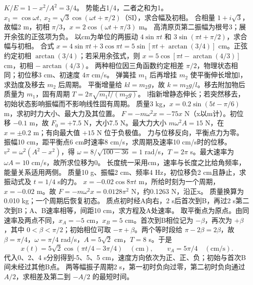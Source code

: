 \workings $K/E=1-x^2/A^2=3/4$。
\crosscheck 势能占1/4，二者之和为1。
\problemtext $x_1=\cos\omega t,\ x_2=\sqrt3\cos(\omega t+\pi/2)$（SI），求合幅及初相。
\workings 合相量 $1+i\sqrt3$，故幅2 m，初相 $\pi/3$，$x=2\cos(\omega t+\pi/3)$ m。
\crosscheck 高清原页第二振幅为根号3；展开余弦的正弦项为负。
\problemtext 以cm为单位的两振动 $4\sin\pi t$ 和 $3\sin(\pi t+\pi/2)$，求合幅与初相。
\workings 合式 $x=4\sin\pi t+3\cos\pi t=5\sin[\pi t+\arctan(3/4)]$ cm。正弦约定初相 $\arctan(3/4)$；若采用余弦式，则 $x=5\cos[\pi t-\arctan(4/3)]$ cm，初相 $-\arctan(4/3)$。
\crosscheck 两种相位因三角函数约定相差 $\pi/2$，物理状态相同；初位移3 cm、初速度 $4\pi$ cm/s。
\problemtext 弹簧挂 $m_1$ 后再增挂 $m_2$ 使平衡伸长增加l，求劲度及移去 $m_2$ 后周期。
\workings 平衡增量给 $kl=m_2g$，故 $k=m_2g/l$。移去附加物后质量为 $m_1$，固有周期 $T=2\pi\sqrt{m_1l/(m_2g)}$。
\crosscheck l指新增静态伸长；若突然移去，初始状态影响振幅而不影响线性固有周期。
\problemtext 质量3 kg，$x=0.2\sin(5t-\pi/6)$ m，求初时力大小、最大力及其位置。
\workings $F=-m\omega^2x=-75x$ N（x以m计）。初位移 $-0.1$ m，故 $F_0=+7.5$ N，大小7.5 N。最大力大小 $m\omega^2A=15$ N，在 $x=\pm0.2$ m；有向最大值 $+15$ N 位于负极值。
\crosscheck 力与位移反向，平衡点力为零。
\problemtext 振幅10 cm，距平衡点6 cm时速率8 cm/s，求周期及速率10 cm/s时的位移。
\workings $v^2=\omega^2(A^2-x^2)$，得 $\omega=8/\sqrt{100-36}=1$ rad/s，$T=2\pi$ s。最大速率为 $\omega A=10$ cm/s，故所求位移为0。
\crosscheck 长度统一采用cm，速率与长度之比给角频率，能量关系适用两侧。
\problemtext 质量10 g、振幅2 cm、频率4 Hz，初位移负2 cm且静止，求振动式及 $t=1/4$ s的力。
\workings $x=-0.02\cos8\pi t$ m，所给时刻为一个周期，$x=-0.02$ m。故 $F=-m\omega^2x=0.0128\pi^2$ N，约0.1263 N，沿正x。
\crosscheck 质量换算为0.010 kg；一个周期后恢复初态。
\problemtext 质点初时经A向右，2 s后首次到B，再过2 s第二次到B；A、B速率相等，间距10 cm，求方程及A处速率。
\workings 取平衡点为原点。由同速率及两点不同，$x_A=-5$ cm，$x_B=5$ cm。首次到B相位记为 $-\beta$，再次为 $+\beta$，其中 $0<\beta<\pi/2$；初始相位可取 $-\pi+\beta$。两个等时段给 $\pi-2\beta=2\beta$，故 $\beta=\pi/4$，$\omega=\pi/4$ rad/s，$A=5\sqrt2$ cm，$T=8$ s。于是
\[
x(t)=5\sqrt2\cos(\pi t/4-3\pi/4)\quad(\mathrm{cm}),\qquad
v_A=5\pi/4\quad(\mathrm{cm/s}).
\]
\crosscheck 代入0、2、4 s分别得到-5、5、5 cm，速度方向依次为正、正、负；初始与首次B间未经过其他B点。
\problemtext 两等幅振子周期2 s，第一初时负向过零，第二初时负向通过 $A/2$，求相差及第二到 $-A/2$ 的最短时间。
